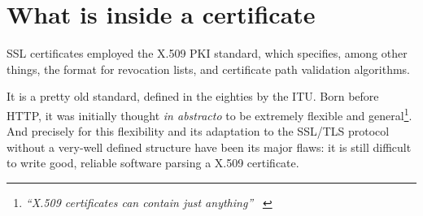 \section{What is inside a certificate \label{sec:ssl:x509}}
SSL certificates employed the X.509 PKI standard, which specifies, among other
things, the format for revocation lists, and certificate path validation
algorithms.
\\
\begin{center}
\end{center}

It is a pretty old standard, defined in the eighties by the ITU.
Born before HTTP, it was initially thought \emph{in abstracto} to be
extremely flexible and general\footnote{
  \textit{``X.509 certificates can contain just anything''} ~\cite{SSLiverse}
}.
And precisely for this flexibility and its adaptation to the SSL/TLS protocol
without a very-well defined structure have been its major flaws: it is still
difficult to write good, reliable software parsing a X.509 certificate.

